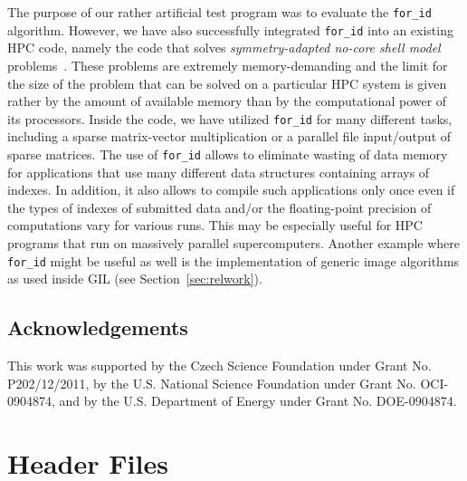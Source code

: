 \documentclass[10pt,a4paper]{article}
\theoremstyle{definition}\newtheorem{problem}{Problem}
\providecommand{\forid}{\texttt{for\_id}\xspace}
\begin{document}
The purpose of our rather artificial test program was to evaluate the \forid algorithm.
However, we have also successfully integrated \forid into an existing HPC code, namely the code that solves \emph{symmetry-adapted no-core shell model} problems~\cite{RefWorks:23,RefWorks:24,RefWorks:25}. These problems are extremely memory-demanding and the limit for the size of the problem that can be solved on a particular HPC system is given rather by the amount of available memory than by the computational power of its processors. Inside the code, we have utilized \forid for many different tasks, including a sparse matrix-vector multiplication or a parallel file input/output of sparse matrices. 
The use of \forid allows to eliminate wasting of data memory for applications that use many different data structures containing arrays of indexes. In addition, it also allows to compile such applications only once even if the types of indexes of submitted data and/or the floating-point precision of computations vary for various runs. This may be especially useful for HPC programs that run on massively parallel supercomputers. Another example where \forid might be useful as well is the implementation of generic image algorithms as used inside GIL (see Section~\ref{sec:relwork}).


\subsection*{Acknowledgements}

This work was supported by the Czech Science Foundation under Grant No. P202/12/2011, by the U.S. National Science Foundation under Grant No. OCI-0904874, and by the U.S. Department of Energy under Grant No. DOE-0904874.

\appendix

\section{Header Files}
\label{sec:hfs}
\end{document}
